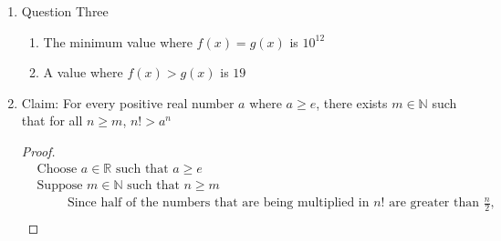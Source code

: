 \documentclass{article}
\begin{document}
\begin{enumerate}
\begin{enumerate}
\begin{proof}
            \begin{eqnarray}
                &&\text{Since } x \text{ has one digit } x < 10 \\
                &&\text{Since } x<10 \text{ and the number of digits of } x \text{ is } 1, \text{ the sum of the digits is } x \\
                &&\text{Since the sum of the digits of } x \text{ is } x \text{, we know } x \geq \text{the sum of the number of digits}
            \end{eqnarray}
            (Inductive Step): \\
            Assume for some $x_1 \in \mathbb{N}$, $k =$ the number of digits in $x_1, x_1 \geq$ the sum of the digits of $x_1$
            \begin{eqnarray}
                \text{Let } c &=& \text{some natural number} < 10 \\
                \text{Let } x_2 &=& x_1 + c \cdot 10^k \hspace{1cm} (x_2 = x_1 \text{ with $c$ added to the beginning, $k+1$ digits}) \\
                \text{So, sum($x_2$)} &=& \text{sum($x_1$)} + c \\
                \text{Therefore, } x_2 &\geq& \text{sum($x_2$)} \hspace{1cm} (\text{by the Induction Hypothesis and $c \cdot 10^k \geq c$})
            \end{eqnarray}
        \end{proof}
    \end{enumerate}
    \item Question Three
    \begin{enumerate}
        \item The minimum value where $f(x) = g(x)$ is $10^{12}$
        \item A value where $f(x) > g(x)$ is $19$
    \end{enumerate}
    \item Claim: For every positive real number $a$ where $a \geq e$, there exists $m \in \mathbb{N}$ such that for all $n \geq m$, $n! > a^n$
    \begin{proof}
        \begin{align}
            &\text{Choose } a \in \mathbb{R} \text{ such that }  a \geq e \\
            &\text{Suppose } m \in \mathbb{N} \text{ such that } n \geq m \\
            &\hspace{1cm} \text{Since half of the numbers that are being multiplied in } n! \text{ are greater than } \frac{n}{2} \text{,} \\

\end{align}
\end{proof}
\end{enumerate}
\end{document}

